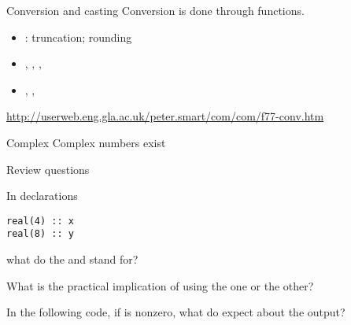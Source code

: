\begin{block}{Conversion and casting}
  Conversion is done through functions.
  \begin{itemize}
  \item {}: truncation;  rounding
  \item {}, , , 
  \item {}, , 
  \end{itemize}
\url{http://userweb.eng.gla.ac.uk/peter.smart/com/com/f77-conv.htm}
\end{block}


\begin{block}{Complex}
  Complex numbers exist
\end{block}

 {Review questions}

\begin{exercise}
  \label{ex:f-elt-rev1}
  In declarations
\begin{verbatim}
real(4) :: x
real(8) :: y
\end{verbatim}
what do the  and  stand for?

What is the practical implication of using the one or the other?
\end{exercise}

\begin{exercise}
  \label{ex:f-elt-rev2}
  In the following code, if  is nonzero, what do expect about
  the output?
\end{exercise}

